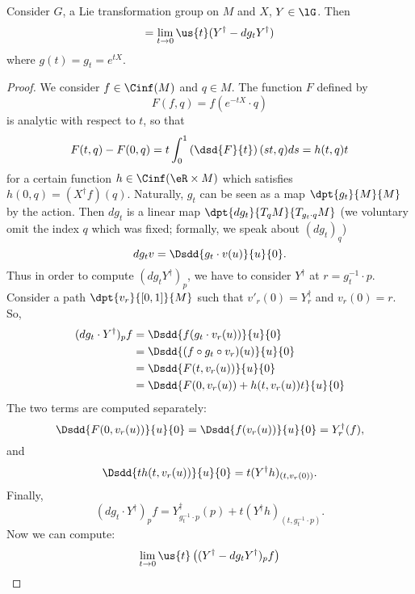\begin{theorem}
Consider $G$, a Lie transformation group on $M$ and $X$, $Y\in\lG$. Then
\begin{equation}
  [X^{\dag},Y^{\dag}]=\lim_{t\to 0}\us{t}(Y^{\dag}-dg_t Y^{\dag})
\end{equation}
where $g(t)=g_t=e^{tX}$.
\end{theorem}

\begin{proof}
We consider $f\in\Cinf(M)$ and $q\in M$. The function $F$ defined by
\begin{equation}
  F(f,q)=f(e^{-tX}\cdot q)
\end{equation}
is analytic with respect to $t$, so that
\begin{equation}\label{eq:def_F_h}
  F(t,q)-F(0,q)=t\int^1_0\left(\dsd{F}{t}\right)(st,q)ds=h(t,q)t
\end{equation}
for a certain function $h\in\Cinf(\eR\times M)$ which satisfies $h(0,q)=(X^{\dag} f)(q)$.
Naturally, $g_t$ can be seen as a map $\dpt{g_t}{M}{M}$ by the action. Then $dg_t$ is a linear map $\dpt{dg_t}{T_qM}{T_{g_t\cdot q}M}$  (we voluntary omit the index $q$ which was fixed; formally, we speak about $(dg_t)_q$)
\[
   dg_tv=\Dsdd{g_t\cdot v(u)}{u}{0}.
\]
Thus in order to compute $(dg_t Y^{\dag})_p$, we have to consider $Y^{\dag}$ at $r=g_t^{-1}\cdot p$. Consider a path $\dpt{v_r}{[0,1]}{M}$ such that $v'_r(0)=Y^{\dag}_r$ and $v_r(0)=r$. So,
\begin{equation}
\begin{split}
(dg_t\cdot Y^{\dag})_pf&=\Dsdd{ f(g_t\cdot v_r(u)) }{u}{0}\\
                     &=\Dsdd{ (f\circ g_t\circ v_r)(u) }{u}{0}\\
		     &=\Dsdd{ F(t,v_r(u)) }{u}{0}\\
		     &=\Dsdd{ F(0,v_r(u))+h(t,v_r(u))t }{u}{0}
\end{split}
\end{equation}
The two terms are computed separately:
\[
   \Dsdd{ F(0,v_r(u)) }{u}{0}=\Dsdd{ f(v_r(u)) }{u}{0}=Y^{\dag}_r(f),
\]
and
\[
    \Dsdd{ th(t,v_r(u)) }{u}{0}=t(Y^{\dag} h)_{(t,v_r(0))}.
\]
Finally,
\begin{equation}\label{eq:Y_h}
  (dg_t\cdot Y^{\dag})_pf=Y^{\dag}_{g_t^{-1}\cdot p}(p)+t(Y^{\dag} h)_{(t,g_t^{-1}\cdot p)}.
\end{equation}
Now we can compute:
\begin{equation}
\begin{aligned}
  \lim_{t\to 0}\us{t}\left( (Y^{\dag}-dg_tY^{\dag})_pf \right)

\end{aligned}
\end{equation}
\end{proof}
